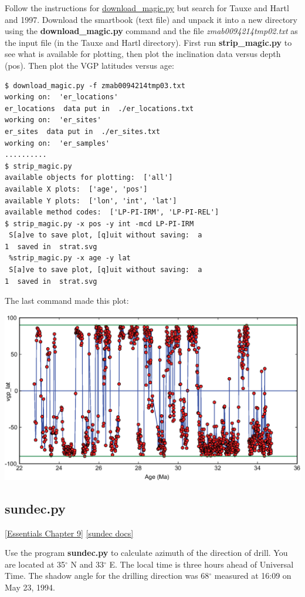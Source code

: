 \documentclass[11pt]{book}
\begin{document}
{Follow the instructions for \href{#download_magic.py}{download\_magic.py} but search for Tauxe and Hartl and 1997.  Download the smartbook (text file) and unpack it into a new directory using the {\bf download\_magic.py} command and the file {\it zmab0094214tmp02.txt} as the input file (in the Tauxe and Hartl directory).   First run {\bf strip\_magic.py} to see what is available for plotting, then
plot the inclination data versus depth (pos).  Then plot the VGP latitudes versus age:
\begin{verbatim}
$ download_magic.py -f zmab0094214tmp03.txt
working on:  'er_locations'
er_locations  data put in  ./er_locations.txt
working on:  'er_sites'
er_sites  data put in  ./er_sites.txt
working on:  'er_samples'
..........
$ strip_magic.py
available objects for plotting:  ['all']
available X plots:  ['age', 'pos']
available Y plots:  ['lon', 'int', 'lat']
available method codes:  ['LP-PI-IRM', 'LP-PI-REL']
$ strip_magic.py -x pos -y int -mcd LP-PI-IRM
 S[a]ve to save plot, [q]uit without saving:  a
1  saved in  strat.svg
 %strip_magic.py -x age -y lat
 S[a]ve to save plot, [q]uit without saving:  a
1  saved in  strat.svg
\end{verbatim}
The last command made this plot:


\includegraphics[width=15cm]{EPSfiles/latVage.eps}



\subsection{sundec.py}
\href{http://earthref.org/MAGIC/books/Tauxe/Essentials/WebBook3ch9.html#ch9}{[Essentials Chapter 9]}
\href{https://github.com/PmagPy/PmagPy/blob/master/programs/sundec.py}{[sundec docs]}

Use the program {\bf sundec.py} to calculate
azimuth of the direction of drill. You are located at 35$^{\circ}$ N and 33$^{\circ}$ E.  The local
time is three hours ahead of Universal Time.  The shadow angle for the
drilling direction was 68$^{\circ}$ measured at 16:09 on May 23, 1994.

}
\end{document}
